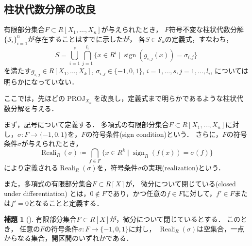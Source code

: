 \documentclass[uplatex, dvipdfmx]{jsarticle}
\numberwithin{equation}{section}
\newcommand{\map}[3]{{#1}\colon{#2}\rightarrow{#3}}
\DeclareMathOperator{\PROJ}{PROJ}
\DeclareMathOperator{\Reali}{Reali}
\DeclareMathOperator{\sign}{sign}
\theoremstyle{definition}
\newtheorem{lemma}[definition]{補題}
\begin{document}
\subsection{柱状代数分解の改良}
有限部分集合$F \subset R[X_1, \dots, X_n]$が与えられたとき，
$F$符号不変な柱状代数分解$\{\mathcal{S}_i\}_{i=1}^n$が存在することはすでに示したが，
各$S \in \mathcal{S}_k$の定義式，すなわち，
\begin{equation}
     S = \bigcup_{i=1}^s \bigcap_{j=1}^{l_i} \{x \in R^i \mid \sign(g_{i,j}(x)) = \sigma_{i,j}\}
\end{equation}
を満たす$g_{i,j} \in R[X_1, \dots, X_k]$, $\sigma_{i,j} \in \{-1, 0, 1\}$, $i=1, \dots, s, j=1, \dots, l_i$, については明らかになっていない．

ここでは，先ほどの$\PROJ_{X_n}$を改良し，定義式まで明らかであるような柱状代数分解を与える．

まず，記号について定義する．
多項式の有限部分集合$F \subset R[X_1, \dots, X_n]$に対し，$\map{\sigma}{F}{\{-1,0,1\}}$を，$F$の符号条件(sign condition)という．
さらに，$F$の符号条件$\sigma$が与えられたとき，
\begin{equation}
     \Reali_R(\sigma)\coloneqq \bigcap_{f \in F}\{x \in R^k \mid \sign_R(f(x)) = \sigma(f)\}
\end{equation}
により定義される$\Reali_R(\sigma)$を，符号条件$\sigma$の実現(realization)という．

また，多項式の有限部分集合$F \subset R[X]$が，
微分について閉じている(closed under differentiation)
とは，$0 \not \in F$であり，かつ任意の$f \in F$に対して，$f' \in F$または$f'=0$となることと定義する．

\begin{lemma}[{\cite[Lemma 5.33]{MR2248869}}]\label{lemma:Thom}
     有限部分集合$F \subset R[X]$が，微分について閉じているとする．
     このとき， 任意の$F$の符号条件$\map{\sigma}{F}{\{-1,0,1\}}$に対し，
     $\Reali_R(\sigma)$は空集合，一点からなる集合，開区間のいずれかである．
\end{lemma}
\end{document}
